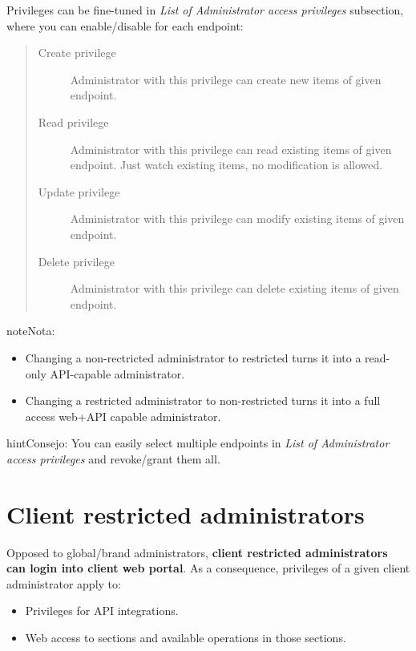 \documentclass[letterpaper,10pt,spanish]{sphinxmanual}
\begin{document}
Privileges can be fine-tuned in \emph{List of Administrator access privileges} subsection, where you can enable/disable
for each endpoint:
\begin{quote}
\begin{description}
\item[{Create privilege}] \leavevmode
Administrator with this privilege can create new items of given endpoint.

\item[{Read privilege}] \leavevmode
Administrator with this privilege can read existing items of given endpoint. Just watch existing items, no
modification is allowed.

\item[{Update privilege}] \leavevmode
Administrator with this privilege can modify existing items of given endpoint.

\item[{Delete privilege}] \leavevmode
Administrator with this privilege can delete existing items of given endpoint.

\end{description}
\end{quote}

\begin{notice}{note}{Nota:}\begin{itemize}
\item {} 
Changing a non-rectricted administrator to restricted turns it into a read-only API-capable administrator.

\item {} 
Changing a restricted administrator to non-restricted turns it into a full access web+API capable administrator.

\end{itemize}
\end{notice}

\begin{notice}{hint}{Consejo:}
You can easily select multiple endpoints in \emph{List of Administrator access privileges} and revoke/grant them all.
\end{notice}


\section{Client restricted administrators}
\label{api_rest/acls:client-restricted-administrators}
Opposed to global/brand administrators, \textbf{client restricted administrators can login into client web portal}. As a
consequence, privileges of a given client administrator apply to:
\begin{itemize}
\item {} 
Privileges for API integrations.

\item {} 
Web access to sections and available operations in those sections.

\end{itemize}
\end{document}
